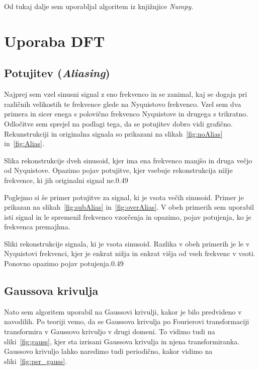 \documentclass{porocilo}
\begin{document}

Od tukaj dalje sem uporabljal algoritem iz knjižnjice \textit{Numpy}.

\section{Uporaba DFT}
\subsection{Potujitev (\textit{Aliasing})}
Najprej sem vzel sinusni signal z eno frekvenco in se zanimal, kaj se dogaja pri različnih velikostih te frekvence glede na Nyquistovo frekvenco. Vzel sem dva primera in sicer enega s polovično frekvenco Nyquistove in drugega s trikratno. Odločitve sem sprejel na podlagi tega, da se potujitev dobro vidi grafično. Rekunstrukciji in originalna signala so prikazani na slikah~\ref{fig:noAlias} in~\ref{fig:Alias}.

\begin{multifig}{2}{Slika rekonstrukcije dveh sinusoid, kjer ima ena frekvenco manjšo in druga večjo od Nyquistove. Opazimo pojav potujitve, kjer vsebuje rekonstrukcija nižje frekvence, ki jih originalni signal ne.}{0.49}
\end{multifig}

Poglejmo si še primer potujitve za signal, ki je vsota večih sinusoid. Primer je prikazan na slikah~\ref{fig:subAlias} in~\ref{fig:overAlias}. V obeh primerih sem uporabil isti signal in le spremenil frekvenco vzorčenja in opazimo, pojav potujenja, ko je frekvenca premajhna.

\begin{multifig}{2}{Sliki rekonstrukcije signala, ki je vsota sinusoid. Razlika v obeh primerih je le v Nyquistovi frekvenci, kjer je enkrat nižja in enkrat višja od vseh frekvenc v vsoti. Ponovno opazimo pojav potujenja.}{0.49}
\end{multifig}

\subsection{Gaussova krivulja}
Nato sem algoritem uporabil na Gaussovi krivulji, kakor je bilo predvideno v navodilih. Po teoriji vemo, da se Gaussova krivulja po Fourierovi transformaciji transformira v Gaussovo krivuljo v drugi domeni. To vidimo tudi na sliki~\ref{fig:gauss}, kjer sta izrisani Gaussova krivulja in njena transformiranka. Gaussovo krivuljo lahko naredimo tudi periodično, kakor vidimo na sliki~\ref{fig:per_gauss}.
\end{document}
